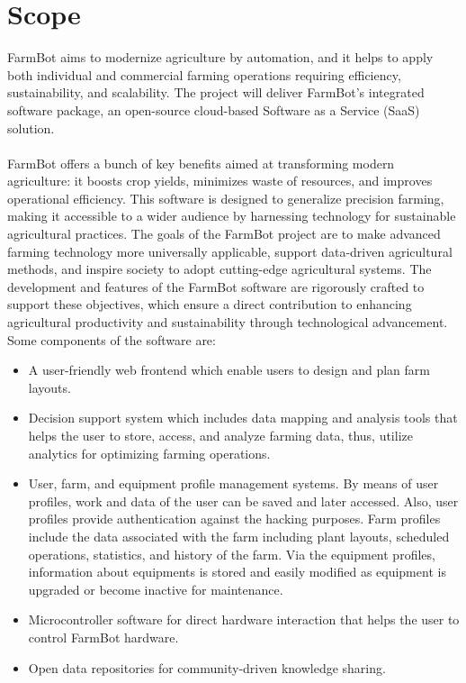 \section{Scope}
FarmBot aims to modernize agriculture by automation, and it helps to apply both individual and commercial farming operations requiring efficiency, sustainability, and scalability. The project will deliver FarmBot's integrated software package, an open-source cloud-based Software as a Service (SaaS) solution. \\\\
FarmBot offers a bunch of key benefits aimed at transforming modern agriculture: it boosts crop yields, minimizes waste of resources, and improves operational efficiency. This software is designed to generalize precision farming, making it accessible to a wider audience by harnessing technology for sustainable agricultural practices. The goals of the FarmBot project are to make advanced farming technology more universally applicable, support data-driven agricultural methods, and inspire society to adopt cutting-edge agricultural systems. The development and features of the FarmBot software are rigorously crafted to support these objectives, which ensure a direct contribution to enhancing agricultural productivity and sustainability through technological advancement. Some components of the software are:
\begin{itemize}
    \item A user-friendly web frontend which enable users to design and plan farm layouts.
    \item Decision support system which includes data mapping and analysis tools that helps the user to store, access, and analyze farming data, thus, utilize analytics for optimizing farming operations.
    \item User, farm, and equipment profile management systems. By means of user profiles, work and data of the user can be saved and later accessed. Also, user profiles provide authentication against the hacking purposes. Farm profiles include the data associated with the farm including plant layouts, scheduled operations, statistics, and history of the farm. Via the equipment profiles, information about equipments is stored and easily modified as equipment is upgraded or become inactive for maintenance.
    \item Microcontroller software for direct hardware interaction that helps the user to control FarmBot hardware.
    \item Open data repositories for community-driven knowledge sharing.
\end{itemize}

